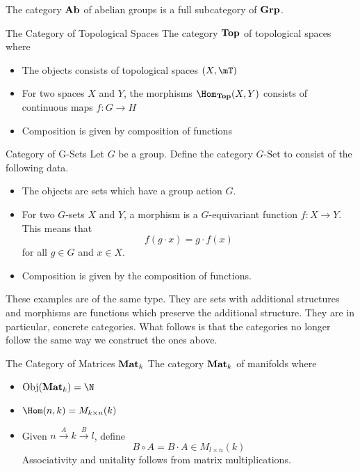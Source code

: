 \documentclass[a4paper]{article}
\begin{document}
The category $\bold{Ab}$ of abelian groups is a full subcategory of $\bold{Grp}$. 

\begin{defn}{The Category of Topological Spaces}{} The category $\bold{Top}$ of topological spaces where 
\begin{itemize}
\item The objects consists of topological spaces $(X,\mT)$
\item For two spaces $X$ and $Y$, the morphisms $\Hom_\bold{Top}(X,Y)$ consists of continuous maps $f:G\to H$
\item Composition is given by composition of functions
\end{itemize}
\end{defn}

\begin{defn}{Category of G-Sets}{} Let $G$ be a group. Define the category $G\text{-Set}$ to consist of the following data. 
\begin{itemize}
\item The objects are sets which have a group action $G$. 
\item For two $G$-sets $X$ and $Y$, a morphism is a $G$-equivariant function $f:X\to Y$. This means that $$f(g\cdot x)=g\cdot f(x)$$ for all $g\in G$ and $x\in X$. 
\item Composition is given by the composition of functions. 
\end{itemize}
\end{defn}

These examples are of the same type. They are sets with additional structures and morphisms are functions which preserve the additional structure. They are in particular, concrete categories. What follows is that the categories no longer follow the same way we construct the ones above. 

\begin{defn}{The Category of Matrices $\bold{Mat}_k$}{} The category $\bold{Mat}_k$ of manifolds where 
\begin{itemize}
\item $\text{Obj}(\bold{Mat}_k)=\N$
\item $\Hom(n,k)=M_{k\times n}(k)$
\item Given $n\overset{A}{\rightarrow}k\overset{B}{\rightarrow}l$, define $$B\circ A=B\cdot A\in M_{l\times n}(k)$$ Associativity and unitality follows from matrix multiplications. 
\end{itemize}
\end{defn}
\end{document}
